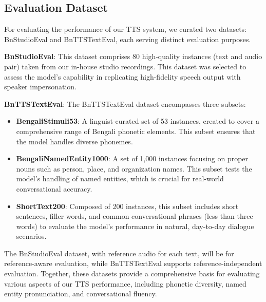\subsection{Evaluation Dataset}

For evaluating the performance of our TTS system, we curated two datasets: BnStudioEval and BnTTSTextEval, each serving distinct evaluation purposes.

\noindent  \textbf{BnStudioEval}: This dataset comprises 80 high-quality instances (text and audio pair) taken from our in-house studio recordings. This dataset was selected to assess the model’s capability in replicating high-fidelity speech output with speaker impersonation. 
    
\noindent \textbf{BnTTSTextEval}: The BnTTSTextEval dataset encompasses three subsets: \begin{itemize}
        \item \textbf{BengaliStimuli53}: A linguist-curated set of 53 instances, created to cover a comprehensive range of Bengali phonetic elements. This subset ensures that the model handles diverse phonemes.
        
        \item \textbf{BengaliNamedEntity1000}: A set of 1,000 instances focusing on proper nouns such as person, place, and organization names. This subset tests the model's handling of named entities, which is crucial for real-world conversational accuracy.
        \item \textbf{ShortText200}: Composed of 200 instances, this subset includes short sentences,  filler words, and common conversational phrases (less than three words) to evaluate the model’s performance in natural, day-to-day dialogue scenarios.
    \end{itemize}  

The BnStudioEval dataset, with reference audio for each text, will be for reference-aware evaluation, while BnTTSTextEval supports reference-independent evaluation. Together, these datasets provide a comprehensive basis for evaluating various aspects of our TTS performance, including phonetic diversity, named entity pronunciation, and conversational fluency. 

